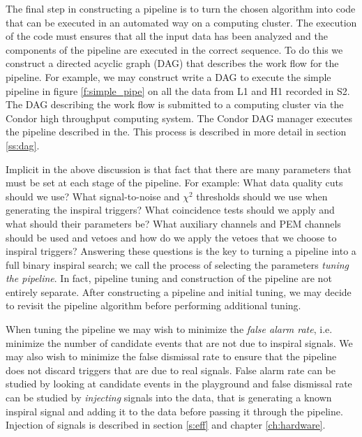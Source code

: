 The final step in constructing a pipeline is to turn the chosen algorithm into
code that can be executed in an automated way on a computing cluster. The
execution of the code must ensures that all the input data has been analyzed
and the components of the pipeline are executed in the correct sequence. To do
this we construct a directed acyclic graph (DAG) that describes the work flow
for the pipeline.  For example, we may construct write a DAG to execute the
simple pipeline in figure \ref{f:simple_pipe} on all the data from L1 and H1
recorded in S2. The DAG describing the work flow is submitted to a computing
cluster via the Condor high throughput computing system. The Condor DAG
manager executes the pipeline described in the. This process is described in
more detail in section \ref{ss:dag}.

Implicit in the above discussion is that fact that there are many parameters
that must be set at each stage of the pipeline. For example: What data quality
cuts should we use? What signal-to-noise and $\chi^2$ thresholds should we use
when generating the inspiral triggers? What coincidence tests should we apply
and what should their parameters be? What auxiliary channels and PEM channels
should be used and vetoes and how do we apply the vetoes that we choose to
inspiral triggers? Answering these questions is the key to turning a pipeline
into a full binary inspiral search; we call the process of selecting the
parameters \emph{tuning the pipeline}. In fact, pipeline tuning and
construction of the pipeline are not entirely separate. After constructing a
pipeline and initial tuning, we may decide to revisit the pipeline algorithm
before performing additional tuning.

When tuning the pipeline we may wish to minimize the \emph{false alarm rate},
i.e. minimize the number of candidate events that are not due to inspiral
signals.  We may also wish to minimize the false dismissal rate to ensure that
the pipeline does not discard triggers that are due to real signals.  False
alarm rate can be studied by looking at candidate events in the playground and
false dismissal rate can be studied by \emph{injecting} signals into the data,
that is generating a known inspiral signal and adding it to the data before
passing it through the pipeline. Injection of signals is described in section
\ref{s:eff} and chapter \ref{ch:hardware}.


